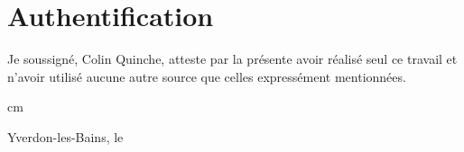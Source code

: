 
\chapter*{Authentification}

Je soussigné, Colin Quinche, atteste par la présente avoir réalisé seul ce travail et n'avoir utilisé aucune autre source que celles expressément mentionnées.

\vfil
{ cm\relax\theauthor\par
    \ifdefined\thesignature
        \printsignature

    \fi
}
\vfil
Yverdon-les-Bains, le \thedate